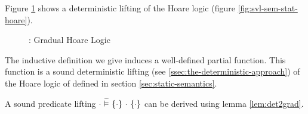Figure \ref{fig:gvl-sem-stat-hoare} shows a deterministic lifting of the Hoare logic (figure \ref{fig:svl-sem-stat-hoare}).
\begin{figure}[h!]
    
    \caption{\gvl: Gradual Hoare Logic} 
    \label{fig:gvl-sem-stat-hoare}
\end{figure}

\begin{lemma}
    The inductive definition we give induces a well-defined partial function.
    This function is a sound deterministic lifting (see \ref{ssec:the-deterministic-approach}) of the Hoare logic of \svlidf defined in section \ref{sec:static-semantics}.
\end{lemma}

A sound predicate lifting ${\cdot} \,\,\widetilde{\vDash}\,\, \{{\cdot}\} ~{\cdot}~ \{{\cdot}\}$ can be derived using lemma \ref{lem:det2grad}.